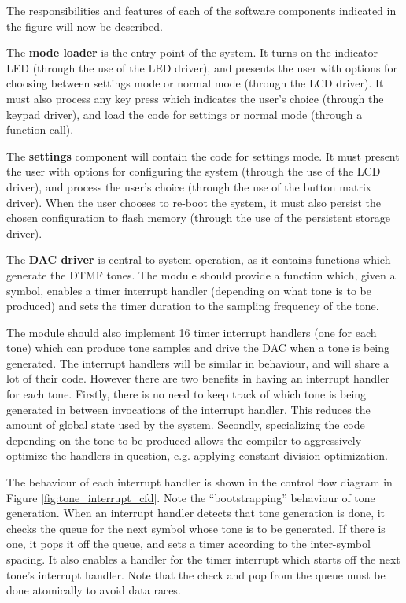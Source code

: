 \documentclass[11pt,a4paper
]{scrartcl}
\begin{document}
The responsibilities and features of each of the software components indicated in the figure will now be described.

The \textbf{mode loader} is the entry point of the system. It turns on the indicator LED (through the use of the LED driver), and presents the user with options
for choosing between settings mode or normal mode (through the LCD driver). It must also process any key press which indicates the user's choice 
(through the keypad driver), and load the code for settings or normal mode (through a function call).

The \textbf{settings} component will contain the code for settings mode. It must present the user with options for configuring the system (through the use of the
LCD driver), and process the user's choice (through the use of the button matrix driver). When the user chooses to re-boot the system, it must also persist the
chosen configuration to flash memory (through the use of the persistent storage driver).

The \textbf{DAC driver} is central to system operation, as it contains functions which generate the DTMF tones. The module should provide a function which, 
given a symbol, enables a timer interrupt handler (depending on what tone is to be produced) and sets the timer duration to the sampling frequency of the tone.

The module should also implement 16 timer interrupt handlers (one for each tone) which can produce tone samples and 
drive the DAC when a tone is being generated. The interrupt handlers will be similar in behaviour, and will share a lot of their code. However
there are two benefits in having an interrupt handler for each tone. Firstly, there is no need to keep track of which tone is being generated in between invocations
of the interrupt handler. This reduces the amount of global state used by the system. Secondly, specializing the code depending on the tone to be produced allows the
compiler to aggressively optimize the handlers in question, e.g. applying constant division optimization.

The behaviour of each interrupt handler is shown in the control flow diagram in Figure \ref{fig:tone_interrupt_cfd}. Note the ``bootstrapping'' behaviour of tone
generation. When an interrupt handler detects that tone generation is done, it checks the queue for the next symbol whose tone is to be generated. 
If there is one, it pops it off the queue, and sets a timer according to the inter-symbol spacing. It also enables a handler for the timer interrupt which
starts off the next tone's interrupt handler. Note that the check and pop from the queue must be done atomically to avoid data races.
\end{document}
